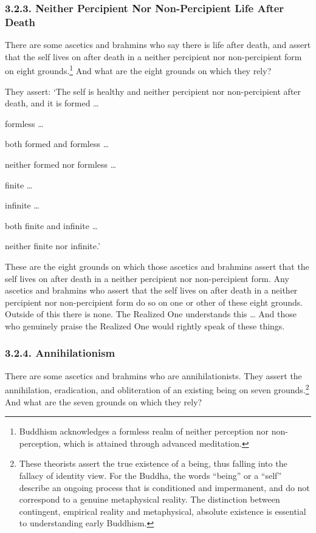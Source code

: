 \documentclass[12pt,openany]{book}%
\begin{document}
\subsubsection*{3.2.3. Neither Percipient Nor Non-Percipient Life After Death }

There are some ascetics and brahmins who say there is life after death, and assert that the self lives on after death in a neither percipient nor non-percipient form on eight grounds.\footnote{Buddhism acknowledges a formless realm of neither perception nor non-perception, which is attained through advanced meditation. } And what are the eight grounds on which they rely? 

They assert: ‘The self is healthy and neither percipient nor non-percipient after death, and it is formed … 

formless … 

both formed and formless … 

neither formed nor formless … 

finite … 

infinite … 

both finite and infinite … 

neither finite nor infinite.’ 

These are the eight grounds on which those ascetics and brahmins assert that the self lives on after death in a neither percipient nor non-percipient form. Any ascetics and brahmins who assert that the self lives on after death in a neither percipient nor non-percipient form do so on one or other of these eight grounds. Outside of this there is none. The Realized One understands this … And those who genuinely praise the Realized One would rightly speak of these things. 

\subsubsection*{3.2.4. Annihilationism }

There are some ascetics and brahmins who are annihilationists. They assert the annihilation, eradication, and obliteration of an existing being on seven grounds.\footnote{These theorists assert the true existence of a being, thus falling into the fallacy of identity view. For the Buddha, the words “being” or a “self” describe an ongoing process that is conditioned and impermanent, and do not correspond to a genuine metaphysical reality. The distinction between contingent, empirical reality and metaphysical, absolute existence is essential to understanding early Buddhism. } And what are the seven grounds on which they rely? 
\end{document}
